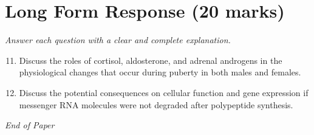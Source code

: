 \documentclass[12pt]{article}
\begin{document}
\section*{Long Form Response (20 marks)}
\textit{Answer each question with a clear and complete explanation.}
\begin{enumerate}[label=\arabic*.]
\setcounter{enumi}{10}
\item Discuss the roles of cortisol, aldosterone, and adrenal androgens in the physiological changes that occur during puberty in both males and females.
\item Discuss the potential consequences on cellular function and gene expression if messenger RNA molecules were not degraded after polypeptide synthesis.
\end{enumerate}

\vfill
\noindent\textit{End of Paper}
\end{document}
